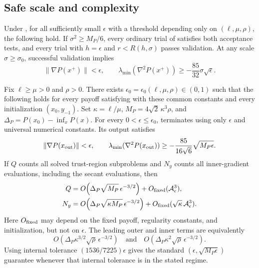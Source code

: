 \documentclass{article}
\begin{document}
\subsection{Safe scale and complexity}

\begin{lemma}
\label{lem:gs-safe}
Under , for all sufficiently small $\epsilon$ with a
threshold depending only on $(\ell,\mu,\rho)$, the following hold.
If $\sigma^2\ge M_P/6$, every ordinary trial of
 satisfies both acceptance tests, and
every trial with $h=\epsilon$ and $r<R(h,\sigma)$ passes validation.
At any scale $\sigma\ge\sigma_0$, successful validation implies
\begin{equation}\label{eq:gs-validator-return}
 \|\nabla P(x^+)\|<\epsilon,
 \qquad
 \lambda_{\min}(\nabla^2P(x^+))
 \ge-\frac{85}{32}\sigma\sqrt\epsilon.
\end{equation}
\end{lemma}

\begin{theorem}
\label{thm:gradient-scaled-scar}
Fix $\ell\ge\mu>0$ and $\rho>0$.  There exists
$\epsilon_0=\epsilon_0(\ell,\mu,\rho)\in(0,1)$ such that the following
holds for every payoff satisfying  with these common
constants and every initialization $(x_0,y_{-1})$.  Set
$\kappa=\ell/\mu$, $M_P=4\sqrt2\,\kappa^3\rho$, and
$\Delta_P=P(x_0)-\inf_xP(x)$.
For every $0<\epsilon\le\epsilon_0$,
 terminates using only $\epsilon$ and
universal numerical constants.  Its output satisfies
\begin{equation}\label{eq:gs-return}
 \|\nabla P(x_{\rm out})\|<\epsilon,
 \qquad
 \lambda_{\min}(\nabla^2P(x_{\rm out}))
 \ge-\frac{85}{16\sqrt6}\sqrt{M_P\epsilon}.
\end{equation}
If $Q$ counts all solved trust-region subproblems and $N_y$ counts
all inner-gradient evaluations, including the secant evaluations, then
\begin{subequations}\label{eq:gs-complexities}
\begin{align}
 Q&=O\!\left(\Delta_P\sqrt{M_P}\,\epsilon^{-3/2}\right)
     +O_{\rm fixed}(\mathcal A_\epsilon^3),
     \label{eq:gs-outer-complexity}\\
 N_y&=O\!\left(
       \Delta_P\sqrt{\kappa M_P}\,\epsilon^{-3/2}\right)
       +O_{\rm fixed}(\sqrt\kappa\,\mathcal A_\epsilon^3).
     \label{eq:gs-inner-complexity}
\end{align}
\end{subequations}
Here $O_{\rm fixed}$ may depend on the fixed payoff, regularity
constants, and initialization, but not on $\epsilon$.  The leading
outer and inner terms are equivalently
\[
 O(\Delta_P\kappa^{3/2}\sqrt\rho\,\epsilon^{-3/2})
 \quad\text{and}\quad
 O(\Delta_P\kappa^2\sqrt\rho\,\epsilon^{-3/2}).
\]
Using internal tolerance $(1536/7225)\epsilon$ gives the standard
$(\epsilon,\sqrt{M_P\epsilon})$ guarantee whenever that internal
tolerance is in the stated regime.
\end{theorem}
\end{document}
